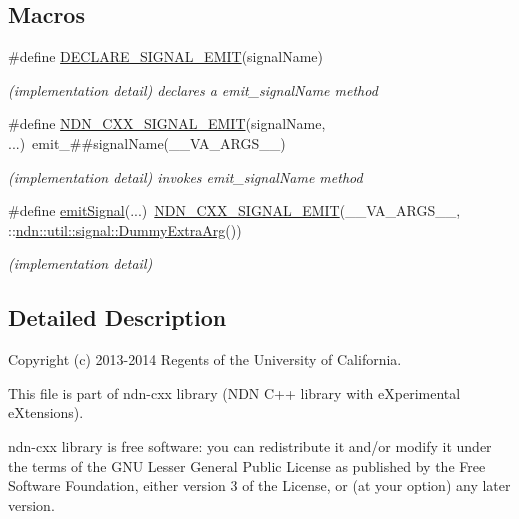 \subsection*{Macros}
\begin{DoxyCompactItemize}
\item 
\#define \hyperlink{signal-emit_8hpp_a8fb62b1067899c74f918fc62a099e8e2}{D\+E\+C\+L\+A\+R\+E\+\_\+\+S\+I\+G\+N\+A\+L\+\_\+\+E\+M\+IT}(signal\+Name)
\begin{DoxyCompactList}\small\item\em (implementation detail) declares a \textquotesingle{}emit\+\_\+signal\+Name\textquotesingle{} method \end{DoxyCompactList}\item 
\#define \hyperlink{signal-emit_8hpp_a6bb25d95564c12bbcb31449319d7b505}{N\+D\+N\+\_\+\+C\+X\+X\+\_\+\+S\+I\+G\+N\+A\+L\+\_\+\+E\+M\+IT}(signal\+Name, ...)~emit\+\_\+\#\#signal\+Name(\+\_\+\+\_\+\+V\+A\+\_\+\+A\+R\+G\+S\+\_\+\+\_\+)
\begin{DoxyCompactList}\small\item\em (implementation detail) invokes emit\+\_\+signal\+Name method \end{DoxyCompactList}\item 
\#define \hyperlink{signal-emit_8hpp_a33665abef4d805a760517424509a19c3}{emit\+Signal}(...)~\hyperlink{signal-emit_8hpp_a6bb25d95564c12bbcb31449319d7b505}{N\+D\+N\+\_\+\+C\+X\+X\+\_\+\+S\+I\+G\+N\+A\+L\+\_\+\+E\+M\+IT}(\+\_\+\+\_\+\+V\+A\+\_\+\+A\+R\+G\+S\+\_\+\+\_\+, \+::\hyperlink{classndn_1_1util_1_1signal_1_1DummyExtraArg}{ndn\+::util\+::signal\+::\+Dummy\+Extra\+Arg}())\hypertarget{signal-emit_8hpp_a33665abef4d805a760517424509a19c3}{}\label{signal-emit_8hpp_a33665abef4d805a760517424509a19c3}

\begin{DoxyCompactList}\small\item\em (implementation detail) \end{DoxyCompactList}\end{DoxyCompactItemize}


\subsection{Detailed Description}
Copyright (c) 2013-\/2014 Regents of the University of California.

This file is part of ndn-\/cxx library (N\+DN C++ library with e\+Xperimental e\+Xtensions).

ndn-\/cxx library is free software\+: you can redistribute it and/or modify it under the terms of the G\+NU Lesser General Public License as published by the Free Software Foundation, either version 3 of the License, or (at your option) any later version.

